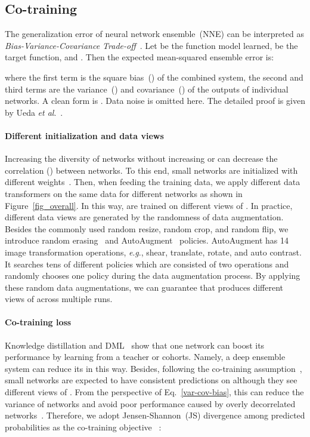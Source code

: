 \documentclass[lettersize,journal]{IEEEtran}
\newcommand{\etal}{\textit{et al}.}
\newcommand{\eg}{\textit{e}.\textit{g}.}
\begin{document}
\subsection{Co-training}
The generalization error of neural network ensemble~(NNE)
can be interpreted as
\emph{Bias-Variance-Covariance Trade-off}~\cite{LiuY99, ROSEN96}.
Let  be the function model learned,  be the target function,
and .
Then the expected mean-squared ensemble error is:
\begin{small}
	 
\end{small}where the first term is the square bias~() of the combined system,
the second and third terms are the variance~() and covariance~()
of the outputs of individual networks.
A clean form is
.
Data noise is omitted here.
The detailed proof is given by Ueda \etal~\cite{UedaN96}.

\paragraph{Different initialization and data views}
Increasing the diversity of networks without
increasing  or  can decrease
the correlation () between networks.
To this end, small networks are
initialized with different weights~\cite{LiWD18}.
Then, when feeding the training data, we apply different data transformers 
on the same data for different networks
as shown in Figure~\ref{fig_overall}.   
In this way,  are trained on different views
 of .
In practice, different data views are generated by the randomness
of data augmentation. Besides the commonly used random resize,
random crop, and random flip,
we introduce random erasing~\cite{zhong2020random} and
AutoAugment~\cite{2019_autoaugment} policies.
AutoAugment has 14 image transformation operations, 
\eg, shear, translate, rotate, and auto contrast.
It searches tens of different policies which
are consisted of two operations and randomly
chooses one policy during the data augmentation process.
By applying these random data augmentations,
we can guarantee that  produces
different views of  across multiple runs.     
\paragraph{Co-training loss}
Knowledge distillation and
DML~\cite{2018_CVPR_DML} show
that one network can boost its performance by learning
from a teacher or cohorts.
Namely, a deep ensemble system can reduce its  in this way.
Besides, following the co-training assumption~\cite{1998_CO},
small networks are expected to have consistent predictions on  
 although they see different views of .
From the perspective of Eq.~\eqref{var-cov-bias},
this can reduce the variance of networks and avoid poor performance
caused by overly decorrelated networks~\cite{ROSEN96}.
Therefore, we adopt Jensen-Shannon~(JS) divergence among predicted probabilities
as the co-training objective~\cite{2018_QiaoSZWY18} :
\end{document}

